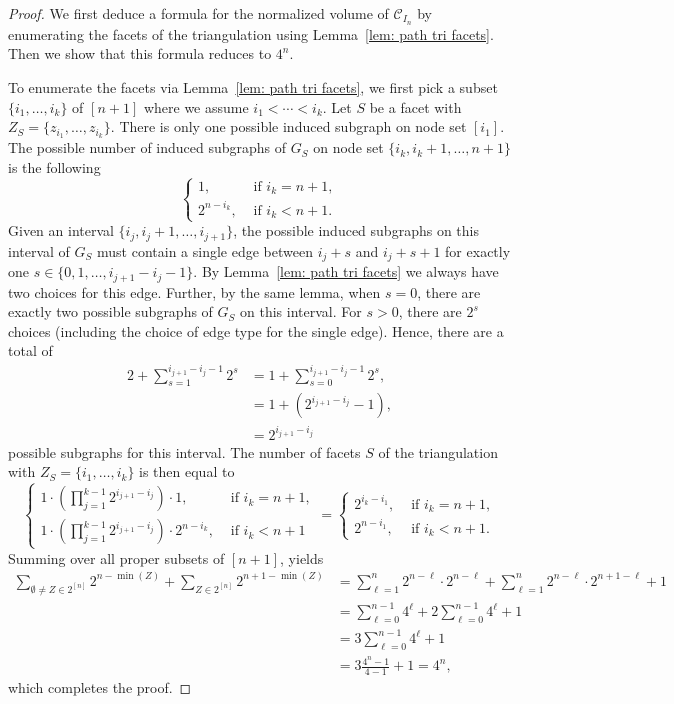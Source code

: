 \begin{proof}
We first deduce a formula for the normalized volume of $\mathcal{C}_{I_{n}}$ by enumerating the facets of the triangulation using Lemma~\ref{lem: path tri facets}.  Then we show that this formula reduces to $4^n$. 

To enumerate the facets via Lemma~\ref{lem: path tri facets}, we first pick a subset $\{i_1,\ldots, i_k\}$ of $[n+1]$ where we assume $i_1 < \cdots < i_k$.  Let $S$ be a facet with $Z_S=\{z_{i_1},\ldots,z_{i_k}\}$.
There is only one possible induced subgraph on node set $[i_1]$. 
The possible number of induced subgraphs of $G_S$ on node set $\{i_k, i_k+1,\ldots, n+1\}$ is the following
\[
\begin{cases}
1,   &   \mbox{ if } i_k = n+1,\\
2^{n-i_k},   &   \mbox{ if } i_k < n+1.
\end{cases}
\]
Given an interval $\{i_j, i_j+1,\ldots, i_{j+1}\}$, the possible induced subgraphs on this interval of $G_S$ must contain a single edge between $i_j +s$ and $i_j + s + 1$ for exactly one  $s\in\{0,1,\ldots, i_{j+1} - i_j -1\}$. 
By Lemma~\ref{lem: path tri facets} we always have two choices for this edge. 
Further, by the same lemma, when $s = 0$, there are exactly two possible subgraphs of $G_S$ on this interval. 
For $s > 0$, there are $2^{s}$ choices (including the choice of edge type for the single edge). 
Hence, there are a total of
\begin{equation*}
\begin{split}
2 + \sum_{s = 1}^{i_{j+1}-i_j -1}2^s
&= 1 + \sum_{s = 0}^{i_{j+1}-i_j -1}2^s,\\
&= 1 + (2^{i_{j+1} - i_j}-1),\\
&= 2^{i_{j+1} - i_j}
\end{split}
\end{equation*}
possible subgraphs for this interval.
The number of facets $S$ of the triangulation with $Z_S = \{i_1,\ldots, i_k\}$ is then equal to 
\[
\begin{cases}
1\cdot \left(\prod_{j=1}^{k-1}2^{i_{j+1} - i_j}\right) \cdot 1,    & \mbox{ if } i_k = n+1,\\
1\cdot \left(\prod_{j=1}^{k-1}2^{i_{j+1} - i_j}\right) \cdot 2^{n-i_k}, & \mbox{ if } i_k < n+1
\end{cases}
= 
\begin{cases}
2^{i_{k} - i_1},   & \mbox{ if } i_k = n+1,\\
2^{n-i_1}, & \mbox{ if } i_k < n+1.
\end{cases}
\]
Summing over all proper subsets of $[n+1]$, yields
\begin{align*}
\sum_{\emptyset\neq Z\in 2^{[n]}}2^{n-\min(Z)}+\sum_{Z\in 2^{[n]}} 2^{n+1-\min(Z)}&=\sum_{\ell=1}^n2^{n-\ell}\cdot 2^{n-\ell}+\sum_{\ell=1}^n2^{n-\ell}\cdot 2^{n+1-\ell}+1\\
&=\sum_{\ell=0}^{n-1}4^\ell+2\sum_{\ell=0}^{n-1}4^\ell+1\\
&=3\sum_{\ell=0}^{n-1}4^\ell+1\\
&=3\frac{4^n-1}{4-1}+1=4^n,
\end{align*}
which completes the proof.
\end{proof}

